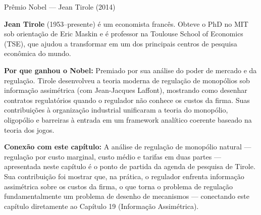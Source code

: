 \documentclass[11pt,twoside,openright]{book}
\begin{document}
\begin{infobox}{Prêmio Nobel — Jean Tirole (2014)}

\textbf{Jean Tirole} (1953--presente) é um economista francês. Obteve o
PhD no MIT sob orientação de Eric Maskin e é professor na Toulouse
School of Economics (TSE), que ajudou a transformar em um dos principais
centros de pesquisa econômica do mundo.

\textbf{Por que ganhou o Nobel:} Premiado por sua análise do poder de
mercado e da regulação. Tirole desenvolveu a teoria moderna de regulação
de monopólios sob informação assimétrica (com Jean-Jacques Laffont),
mostrando como desenhar contratos regulatórios quando o regulador não
conhece os custos da firma. Suas contribuições à organização industrial
unificaram a teoria do monopólio, oligopólio e barreiras à entrada em um
framework analítico coerente baseado na teoria dos jogos.

\textbf{Conexão com este capítulo:} A análise de regulação de monopólio
natural --- regulação por custo marginal, custo médio e tarifas em duas
partes --- apresentada neste capítulo é o ponto de partida da agenda de
pesquisa de Tirole. Sua contribuição foi mostrar que, na prática, o
regulador enfrenta informação assimétrica sobre os custos da firma, o
que torna o problema de regulação fundamentalmente um problema de
desenho de mecanismos --- conectando este capítulo diretamente ao
Capítulo 19 (Informação Assimétrica).

\end{infobox}
\end{document}
